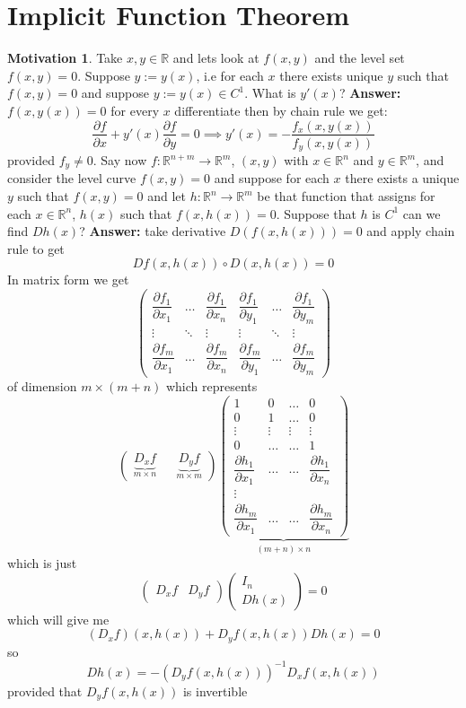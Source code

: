 \documentclass[11pt,openany]{book}
\theoremstyle{plain}
\theoremstyle{definition}
\newtheorem{motivation}{Motivation}[chapter]
\theoremstyle{remark}
\newcommand{\R}{\mathbb{R}}
\newcommand{\dell}[2]{\dfrac{\partial #1}{\partial #2}}
\begin{document}
\section{Implicit Function Theorem}
\begin{motivation}
    Take $x,y \in \R$ and lets look at $f(x,y)$ and the level set $f(x,y) = 0$. Suppose $y := y(x)$, i.e for each $x$ there exists unique $y$ such that $f(x,y) = 0$ and suppose $y:=y(x) \in C^1$. What is $y'(x)$? \textbf{Answer:} $f(x,y(x)) =0$ for every $x$ differentiate then by chain rule we get: \[\dell{f}{x}+ y'(x)\dell{f}{y} = 0 \implies y'(x) = -\frac{f_x(x,y(x))}{f_y(x,y(x))}\] provided $f_y \ne 0$. 
    Say now $f: \R^{n+m} \to \R^m$, $(x,y)$ with $x \in \R^n$ and $y \in \R^m$, and consider the level curve $f(x,y) = 0$ and suppose for each $x$ there exists a unique $y$ such that $f(x,y) = 0$ and let $h: \R^n \to \R^m$ be that function that assigns for each $x \in \R^n$, $h(x)$ such that $f(x,h(x)) = 0$. Suppose that $h$ is $C^1$ can we find $Dh(x)$? \textbf{Answer:} take derivative $D(f(x,h(x))) = 0$ and apply chain rule to get \[Df(x,h(x)) \circ D(x,h(x)) = 0\] In matrix form we get \[\begin{pmatrix} \dell{f_1}{x_1} & \dots & \dell{f_1}{x_n} & \dell{f_1}{y_1} & \dots & \dell{f_1}{y_m} \\ \vdots & \ddots& \vdots & \vdots  & \ddots& \vdots  \\ \dell{f_m}{x_1} & \dots & \dell{f_m}{x_n}& \dell{f_m}{y_1} & \dots & \dell{f_m}{y_m} \end{pmatrix}\] of dimension $m \times (m+n)$ which represents \[\begin{pmatrix} \underbrace{D_xf}_{m \times n} && \underbrace{D_yf}_{m \times m}\end{pmatrix}\underbrace{\begin{pmatrix} 1 & 0 & \dots & 0 \\ 0 & 1 & \dots & 0 \\ \vdots & \vdots & \vdots & \vdots \\ 0 & \dots & \dots  & 1 \\ \dell{h_1}{x_1} & \dots &\dots & \dell{h_1}{x_n} \\ \vdots \\ \dell{h_m}{x_1} & \dots & \dots & \dell{h_m}{x_n} \end{pmatrix}}_{(m+n) \times n}\] which is just \[\begin{pmatrix}
        D_xf & D_yf
    \end{pmatrix} \begin{pmatrix}
        I_n \\ Dh(x)
    \end{pmatrix} = 0\] which will give me \[(D_xf)(x,h(x))+D_yf(x,h(x))Dh(x) = 0\] so \[Dh(x) = -(D_yf(x,h(x)))^{-1}D_xf(x,h(x))\] provided that $D_yf(x,h(x))$ is invertible
\end{motivation}
\end{document}
